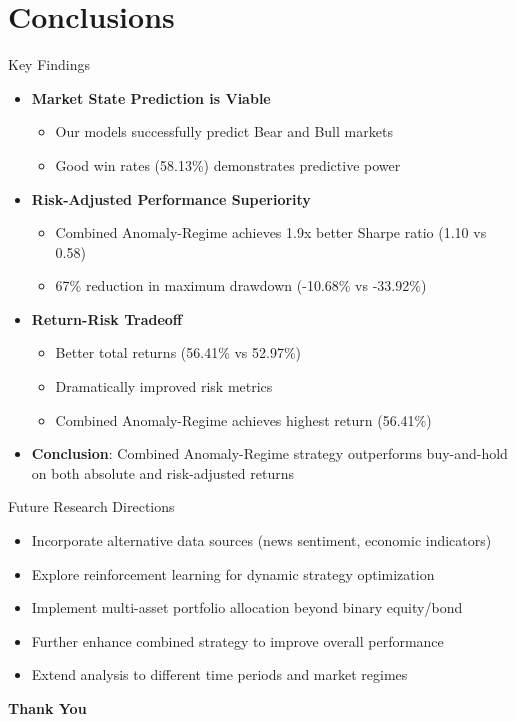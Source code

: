 \documentclass[aspectratio=169,xcolor=dvipsnames]{beamer}
\begin{document}
\section{Conclusions}
\begin{frame}{Key Findings}
    \begin{itemize}
        \item \textbf{Market State Prediction is Viable}
              \begin{itemize}
                  \item Our models successfully predict Bear and Bull markets
                  \item Good win rates (58.13\%) demonstrates predictive power
              \end{itemize}
        \item \textbf{Risk-Adjusted Performance Superiority}
              \begin{itemize}
                  \item Combined Anomaly-Regime achieves 1.9x better Sharpe ratio (1.10 vs 0.58)
                  \item 67\% reduction in maximum drawdown (-10.68\% vs -33.92\%)
              \end{itemize}
        \item \textbf{Return-Risk Tradeoff}
              \begin{itemize}
                  \item Better total returns (56.41\% vs 52.97\%)
                  \item Dramatically improved risk metrics
                  \item Combined Anomaly-Regime achieves highest return (56.41\%)
              \end{itemize}
        \item \textbf{Conclusion}: Combined Anomaly-Regime strategy outperforms buy-and-hold on both absolute and risk-adjusted returns
    \end{itemize}
\end{frame}

\begin{frame}{Future Research Directions}
    \begin{itemize}
        \item Incorporate alternative data sources (news sentiment, economic indicators)
        \item Explore reinforcement learning for dynamic strategy optimization
        \item Implement multi-asset portfolio allocation beyond binary equity/bond
        \item Further enhance combined strategy to improve overall performance
        \item Extend analysis to different time periods and market regimes
    \end{itemize}
\end{frame}

\begin{frame}
    \Huge{\centerline{\textbf{Thank You}}}
\end{frame}

\end{document}
